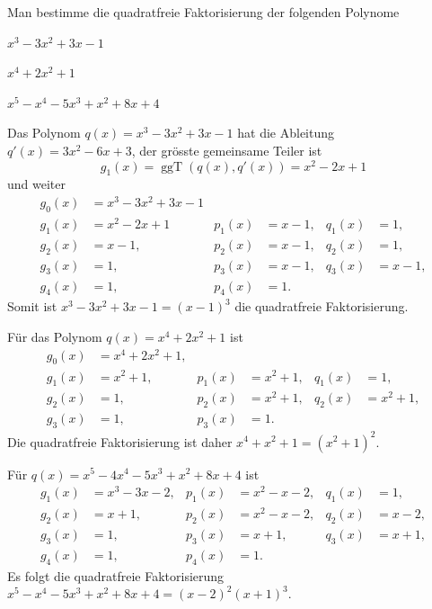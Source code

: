 Man bestimme die quadratfreie Faktorisierung der folgenden Polynome
\begin{teilaufgaben}
\item $x^3-3x^2+3x-1$
\item $x^4+2x^2+1$
\item $x^5-x^4-5x^3+x^2+8x+4$
\end{teilaufgaben}

\begin{loesung}
\begin{teilaufgaben}
\item Das Polynom $q(x)=x^3-3x^2+3x-1$ hat die Ableitung $q'(x)=3x^2-6x+3$,
der grösste gemeinsame Teiler ist
\[
g_1(x)
=
\operatorname{ggT}(q(x),q'(x))
=
x^2-2x+1
\]
und weiter
\begin{align*}
g_0(x)
&=
x^3-3x^2+3x-1
&&
&&
\\
g_1(x)
&=
x^2-2x+1
&
p_1(x)
&=
x-1,
&
q_1(x)
&=
1,
\\
g_2(x)
&=
x-1,
&
p_2(x)
&=
x-1,
&
q_2(x)
&=
1,
\\
g_3(x)
&=
1,
&
p_3(x)
&=
x-1,
&
q_3(x)
&=
x-1,
\\
g_4(x)
&=
1,
&
p_4(x)
&=
1.
&&
\end{align*}
Somit ist $x^3-3x^2+3x-1=(x-1)^3$ die quadratfreie Faktorisierung.
\item
Für das Polynom $q(x)=x^4+2x^2+1$ ist 
\begin{align*}
g_0(x)
&=
x^4+2x^2+1,
&&
&&
\\
g_1(x)
&=
x^2+1,
&
p_1(x)
&=
x^2+1,
&
q_1(x)
&=
1,
\\
g_2(x)
&=
1,
&
p_2(x)
&=
x^2+1,
&
q_2(x)
&=
x^2+1,
\\
g_3(x)
&=
1,
&
p_3(x)
&=
1.
&&
\end{align*}
Die quadratfreie Faktorisierung ist daher $x^4+x^2+1 = (x^2+1)^2$.
\item
Für $q(x)=x^5-4x^4-5x^3+x^2+8x+4$ ist
\begin{align*}
g_1(x)
&=
x^3-3x-2,
&
p_1(x)
&=
x^2-x-2,
&
q_1(x)
&=
1,
\\
g_2(x)
&=
x+1,
&
p_2(x)
&=
x^2-x-2,
&
q_2(x)
&=
x-2,
\\
g_3(x)
&=
1,
&
p_3(x)
&=
x+1,
&
q_3(x)
&=
x+1,
\\
g_4(x)
&=
1,
&
p_4(x)
&=
1.
&&
\end{align*}
Es folgt die quadratfreie Faktorisierung
$x^5-x^4-5x^3+x^2+8x+4
=
(x-2)^2(x+1)^3
$.
\qedhere
\end{teilaufgaben}
\end{loesung}
